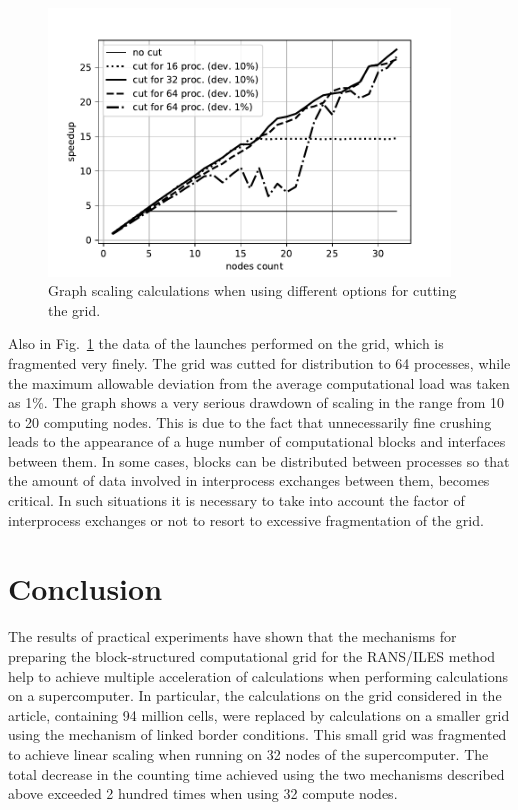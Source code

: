 \documentclass[
11pt,%
tightenlines,%
twoside,%
onecolumn,%
nofloats,%
nobibnotes,%
nofootinbib,%
superscriptaddress,%
noshowpacs,%
centertags]%
{revtex4}
\begin{document}
\begin{figure}[h]
\setcaptionmargin{5mm}
\onelinecaptionstrue
\includegraphics[width=0.95\textwidth]{pics/plot_36_scaling_2.pdf}
\caption{Graph scaling calculations when using different options for cutting the grid.}
\label{fig:plot_36_scaling_2}
\end{figure}

Also in Fig.~\ref{fig:plot_36_scaling_2} the data of the launches performed on the grid, which is fragmented very finely.
The grid was cutted for distribution to 64 processes, while the maximum allowable deviation from the average computational load was taken as 1\%.
The graph shows a very serious drawdown of scaling in the range from 10 to 20 computing nodes.
This is due to the fact that unnecessarily fine crushing leads to the appearance of a huge number of computational blocks and interfaces between them.
In some cases, blocks can be distributed between processes so that the amount of data involved in interprocess exchanges between them, becomes critical.
In such situations it is necessary to take into account the factor of interprocess exchanges or not to resort to excessive fragmentation of the grid.

\section{Conclusion}

The results of practical experiments have shown that the mechanisms for preparing the block-structured computational grid for the RANS/ILES method help to achieve multiple acceleration of calculations when performing calculations on a supercomputer.
In particular, the calculations on the grid considered in the article, containing 94 million cells, were replaced by calculations on a smaller grid using the mechanism of linked border conditions.
This small grid was fragmented to achieve linear scaling when running on 32 nodes of the supercomputer.
The total decrease in the counting time achieved using the two mechanisms described above exceeded 2 hundred times when using 32 compute nodes.
\end{document}
